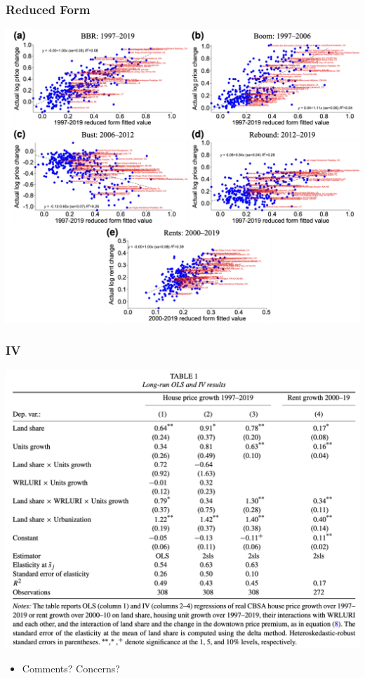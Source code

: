 \documentclass[english,xcolor=svgnames]{beamer}
\begin{document}
\begin{frame}
	\frametitle[alignment=center]{Reduced Form}
	\centering
	\includegraphics[scale=0.4]{figures/CGMFIG4.png}
\end{frame}

\begin{frame}
	\frametitle[alignment=center]{IV}
	\centering
	\includegraphics[scale=0.4]{figures/CGMTAB1.png}
	\begin{itemize}
		\item Comments? Concerns?
	\end{itemize}
\end{frame}
\end{document}
